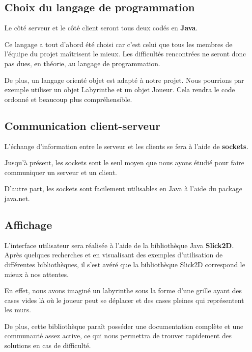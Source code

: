     \subsection{Choix du langage de programmation}
        Le côté serveur et le côté client seront tous deux codés en \textbf{Java}.

        Ce langage a tout d'abord été choisi car c'est celui que tous les membres de l'équipe du projet maîtrisent le mieux. Les difficultés rencontrées ne seront donc pas dues, en théorie, au langage de programmation.

        De plus, un langage orienté objet est adapté à notre projet. Nous pourrions par exemple utiliser un objet Labyrinthe et un objet Joueur. Cela rendra le code ordonné et beaucoup plus compréhensible.

    \subsection{Communication client-serveur}
        L'échange d'information entre le serveur et les clients se fera à l'aide de \textbf{sockets}.

        Jusqu'à présent, les sockets sont le seul moyen que nous ayons étudié pour faire communiquer un serveur et un client.

        D'autre part, les sockets sont facilement utilisables en Java à l'aide du package java.net.

    \subsection{Affichage}
        L'interface utilisateur sera réalisée à l'aide de la bibliothèque Java \textbf{Slick2D}. Après quelques recherches et en visualisant des exemples d'utilisation de différentes bibliothèques, il s'est avéré que la bibliothèque Slick2D correspond le mieux à nos attentes.

        En effet, nous avons imaginé un labyrinthe sous la forme d'une grille ayant des cases vides là où le joueur peut se déplacer et des cases pleines qui représentent les murs.

        De plus, cette bibliothèque paraît posséder une documentation complète et une communauté assez active, ce qui nous permettra de trouver rapidement des solutions en cas de difficulté.
